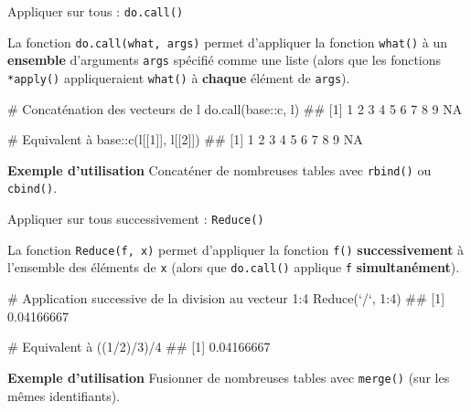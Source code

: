 \documentclass[12pt,ignorenonframetext,]{beamer}
\newenvironment{Shaded}{}{}
\newcommand{\CommentTok}[1]{\textcolor[rgb]{0.00,0.50,0.00}{#1}}
\newcommand{\DataTypeTok}[1]{#1}
\newcommand{\DecValTok}[1]{#1}
\newcommand{\KeywordTok}[1]{\textcolor[rgb]{0.00,0.00,1.00}{#1}}
\newcommand{\NormalTok}[1]{#1}
\newcommand{\OperatorTok}[1]{#1}
\newcommand{\StringTok}[1]{\textcolor[rgb]{0.00,0.50,0.50}{#1}}
\renewenvironment{Shaded}{\begin{snugshade}}{\end{snugshade}}
\newcommand{\intertitre}[1]{\textcolor{redInsee}{\textbf{#1}}}
\begin{document}
\begin{frame}[fragile]{\large Appliquer sur tous : \texttt{do.call()}}
\protect\hypertarget{appliquer-sur-tous-do.call}{}

La fonction \texttt{do.call(what,\ args)} permet d’appliquer la fonction
\texttt{what()} à un \textbf{ensemble} d’arguments \texttt{args}
spécifié comme une liste (alors que les fonctions \texttt{*apply()}
appliqueraient \texttt{what()} à \textbf{chaque} élément de
\texttt{args}).

\pause \small

\begin{Shaded}
\begin{Highlighting}[]
\CommentTok{# Concaténation des vecteurs de l}
\KeywordTok{do.call}\NormalTok{(base}\OperatorTok{::}\NormalTok{c, l)}
\NormalTok{  ##  [1]  1  2  3  4  5  6  7  8  9 NA}

\CommentTok{# Equivalent à }
\NormalTok{base}\OperatorTok{::}\KeywordTok{c}\NormalTok{(l[[}\DecValTok{1}\NormalTok{]], l[[}\DecValTok{2}\NormalTok{]])}
\NormalTok{  ##  [1]  1  2  3  4  5  6  7  8  9 NA}
\end{Highlighting}
\end{Shaded}

\pause \normalsize

\intertitre{Exemple d'utilisation} Concaténer de nombreuses tables avec
\texttt{rbind()} ou \texttt{cbind()}.

\end{frame}

\begin{frame}[fragile]{\large Appliquer sur tous successivement :
\texttt{Reduce()}}
\protect\hypertarget{appliquer-sur-tous-successivement-reduce}{}

La fonction \texttt{Reduce(f,\ x)} permet d’appliquer la fonction
\texttt{f()} \textbf{successivement} à l’ensemble des éléments de
\texttt{x} (alors que \texttt{do.call()} applique \texttt{f}
\textbf{simultanément}).

\pause \small

\begin{Shaded}
\begin{Highlighting}[]
\CommentTok{# Application successive de la division au vecteur 1:4}
\KeywordTok{Reduce}\NormalTok{(}\StringTok{`}\DataTypeTok{/}\StringTok{`}\NormalTok{, }\DecValTok{1}\OperatorTok{:}\DecValTok{4}\NormalTok{)}
\NormalTok{  ## [1] 0.04166667}

\CommentTok{# Equivalent à }
\NormalTok{((}\DecValTok{1}\OperatorTok{/}\DecValTok{2}\NormalTok{)}\OperatorTok{/}\DecValTok{3}\NormalTok{)}\OperatorTok{/}\DecValTok{4}
\NormalTok{  ## [1] 0.04166667}
\end{Highlighting}
\end{Shaded}

\pause \normalsize

\intertitre{Exemple d'utilisation} Fusionner de nombreuses tables avec
\texttt{merge()} (sur les mêmes identifiants).

\end{frame}
\end{document}

